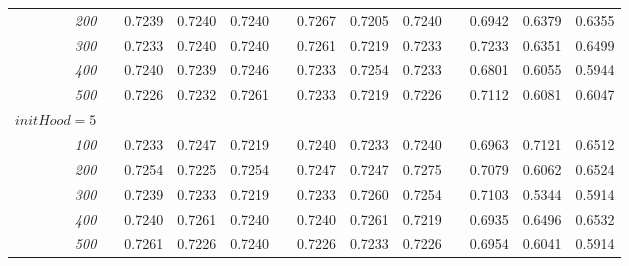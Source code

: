 \documentclass[a4paper, 10pt]{article}
\begin{document}
\begin{figure}[h]
\begin{tabular}{@{}rcrrrcrrrcrrr@{}}
      \emph{200}  &&  0.7239  &  0.7240  &  0.7240  &&  0.7267  &  0.7205  &  0.7240  &&  0.6942  &  0.6379  &  0.6355 \\
      \emph{300}  &&  0.7233  &  0.7240  &  0.7240  &&  0.7261  &  0.7219  &  0.7233  &&  0.7233  &  0.6351  &  0.6499 \\
      \emph{400}  &&  0.7240  &  0.7239  &  0.7246  &&  0.7233  &  0.7254  &  0.7233  &&  0.6801  &  0.6055  &  0.5944 \\
      \emph{500}  &&  0.7226  &  0.7232  &  0.7261  &&  0.7233  &  0.7219  &  0.7226  &&  0.7112  &  0.6081  &  0.6047 \\
      $initHood = 5$ \\
      \emph{100}  &&  0.7233  &  0.7247  &  0.7219  &&  0.7240  &  0.7233  &  0.7240  &&  0.6963  &  0.7121  &  0.6512 \\
      \emph{200}  &&  0.7254  &  0.7225  &  0.7254  &&  0.7247  &  0.7247  &  0.7275  &&  0.7079  &  0.6062  &  0.6524 \\
      \emph{300}  &&  0.7239  &  0.7233  &  0.7219  &&  0.7233  &  0.7260  &  0.7254  &&  0.7103  &  0.5344  &  0.5914 \\
      \emph{400}  &&  0.7240  &  0.7261  &  0.7240  &&  0.7240  &  0.7261  &  0.7219  &&  0.6935  &  0.6496  &  0.6532 \\
      \emph{500}  &&  0.7261  &  0.7226  &  0.7240  &&  0.7226  &  0.7233  &  0.7226  &&  0.6954  &  0.6041  &  0.5914 \\

\end{tabular}
\end{figure}
\end{document}
